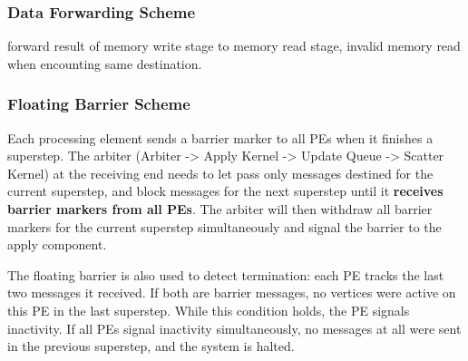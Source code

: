 \documentclass[UTF8,12pt,a4paper]{article}
\begin{document}
\subsubsection{Data Forwarding Scheme}
forward result of memory write stage to memory read stage,
invalid memory read when encounting same destination.
\subsubsection{Floating Barrier Scheme}
\label{ssub:floating barrier scheme}
Each processing element sends a barrier marker to
all PEs when it finishes a superstep.
The arbiter (Arbiter -> Apply Kernel -> Update Queue -> Scatter Kernel)
at the receiving end needs to
let pass only messages destined for the current superstep,
and block messages for the next superstep until it \textbf{receives barrier markers from all PEs}.
The arbiter will then withdraw all barrier markers for the current superstep simultaneously
and signal the barrier to the apply component.

The floating barrier is also used to detect termination:
each PE tracks the last two messages it received.
If both are barrier messages, no vertices were active on this PE in the last superstep.
While this condition holds, the PE signals inactivity.
If all PEs signal inactivity simultaneously,
no messages at all were sent in the previous superstep,
and the system is halted.

\clearpage



\newpage
\end{document}

